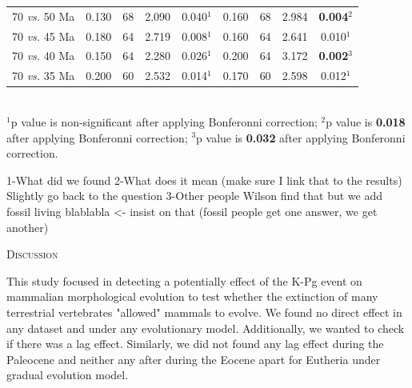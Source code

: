 \documentclass[12pt,letterpaper]{article}
\renewcommand{\section}[1]{%
\bigskip
\begin{center}
\begin{Large}
\normalfont\scshape #1
\medskip
\end{Large}
\end{center}}
\begin{document}
\begin{table}[ht]
\begin{tabular}{c|cccc|cccc}
  70 \textit{vs.} 50 Ma &  0.130 & 68 & 2.090 & 0.040$^1$ & 0.160 & 68 & 2.984 & \textbf{0.004}$^2$ \\ 
  70 \textit{vs.} 45 Ma &  0.180 & 64 & 2.719 & 0.008$^1$ & 0.160 & 64 & 2.641 & 0.010$^1$ \\ 
  70 \textit{vs.} 40 Ma &  0.150 & 64 & 2.280 & 0.026$^1$ & 0.200 & 64 & 3.172 & \textbf{0.002}$^3$ \\ 
  70 \textit{vs.} 35 Ma &  0.200 & 60 & 2.532 & 0.014$^1$ & 0.170 & 60 & 2.598 & 0.012$^1$ \\ 
   \hline
\end{tabular} \\
   \small{$^1$p value is non-significant after applying Bonferonni correction;
   $^2$p value is \textbf{0.018} after applying Bonferonni correction;
   $^3$p value is \textbf{0.032} after applying Bonferonni correction.}
\end{table}



%
%



1-What did we found
2-What does it mean (make sure I link that to the results)
    Slightly go back to the question
3-Other people Wilson find that but we add fossil living blablabla <- insist on that (fossil people get one answer, we get another)

\section{Discussion}



This study focused in detecting a potentially effect of the K-Pg event on mammalian morphological evolution to test whether the extinction of many terrestrial vertebrates "allowed" mammals to evolve.
We found no direct effect in any dataset and under any evolutionary model.
Additionally, we wanted to check if there was a lag effect.
Similarly, we did not found any lag effect during the Paleocene and neither any after during the Eocene apart for Eutheria under gradual evolution model.
\end{document}
